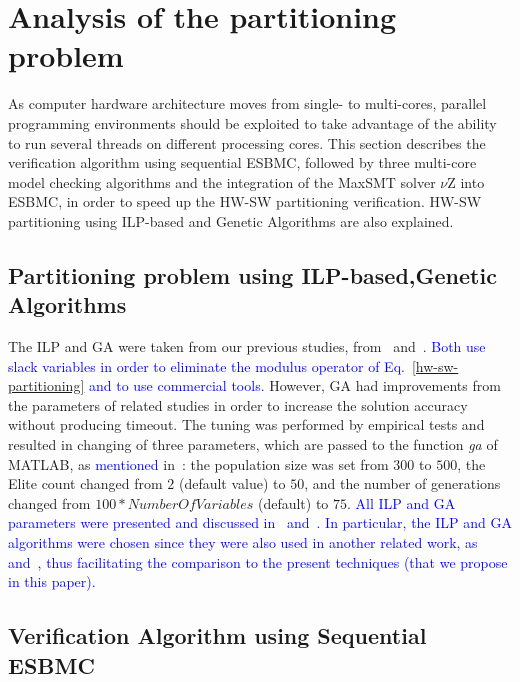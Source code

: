 \documentclass{doublecol-new}
\theoremstyle{TH}{
\newtheorem{lemma}{Lemma}
\newtheorem{theorem}[lemma]{Theorem}
\newtheorem{corrolary}[lemma]{Corrolary}
\newtheorem{conjecture}[lemma]{Conjecture}
\newtheorem{proposition}[lemma]{Proposition}
\newtheorem{claim}[lemma]{Claim}
\newtheorem{stheorem}[lemma]{Wrong Theorem}
\newtheorem{algorithm}{Algorithm}
}
\theoremstyle{THrm}{
\newtheorem{definition}{Definition}[section]
\newtheorem{question}{Question}[section]
\newtheorem{remark}{Remark}
\newtheorem{scheme}{Scheme}
}
\theoremstyle{THhit}{
\newtheorem{case}{Case}[section]
}
\begin{document}
\section{Analysis of the partitioning problem}
\label{Analysis-of-the-partitioning-problem-using-ESBMC}

As computer hardware architecture moves from single- to multi-cores, parallel programming environments should be exploited to take advantage of the ability to run several threads on different processing cores. This section describes the verification algorithm using sequential ESBMC, followed by three multi-core model checking algorithms and the integration of the MaxSMT solver $\nu$Z into ESBMC, in order to speed up the HW-SW partitioning verification. HW-SW partitioning using ILP-based and Genetic Algorithms are also explained.

\subsection{Partitioning problem using ILP-based,Genetic Algorithms}
\label{ILPGA}

The ILP and GA were taken from our previous studies, from~\cite{Trindade2015} and~\cite{Trindade2016}. \textcolor{blue}{Both use slack variables in order to eliminate the modulus operator of Eq.~\eqref{hw-sw-partitioning} and to use commercial tools.} However, GA had improvements from the parameters of related studies in order to increase the solution accuracy without producing timeout. The tuning was performed by empirical tests and resulted in changing of three parameters, which are passed to the function \textit{ga} of MATLAB, as \textcolor{blue}{mentioned} in~\cite{TheMathWorks2013}: the population size was set from $300$ to $500$, the Elite count changed from $2$ (default value) to $50$, and the number of generations changed from $100*NumberOfVariables$ (default) to $75$. \textcolor{blue}{All ILP and GA parameters were presented and discussed in~\cite{Trindade2015} and~\cite{Trindade2016}. In particular, the ILP and GA algorithms were chosen since they were also used in another related work, as~\cite{Arato2003} and~\cite{Mann2007}, thus facilitating the comparison to the present techniques (that we propose in this paper).}

\subsection{Verification Algorithm using Sequential ESBMC}
\label{Verification-Algorithm-using-ESBMC}
\end{document}
